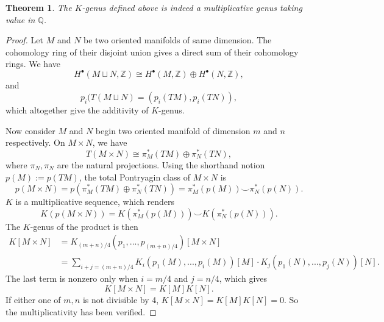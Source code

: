 \documentclass[11pt]{article}
\newtheorem{thm}{Theorem}[section]
\newcommand{\intg}{\mathbb Z}
\newcommand{\ratl}{\mathbb Q}
\begin{document}
 	\begin{thm}
 		The $K$-genus defined above is indeed a multiplicative genus taking value in $\ratl$.
 	\end{thm}
 	\begin{proof}
 		Let $M$ and $N$ be two oriented manifolds of same dimension. The cohomology ring of their disjoint union  gives a direct sum of their cohomology rings. We have
 		\begin{equation*}
 			H^\bullet(M\sqcup N,\intg)\cong H^\bullet(M,\intg)\oplus H^\bullet(N,\intg),
 		\end{equation*}
 		and 
 		\begin{equation*}
 			p_i(T(M\sqcup N)=(p_i(TM),p_i(TN)),
 		\end{equation*}
 		which altogether give the additivity of $K$-genus.

 		Now consider $M$ and $N$ begin two oriented manifold of dimension $m$ and $n$ respectively. On $M\times N$, we have
 		\begin{equation*}
 		T(M\times N)\cong \pi_M^*(TM)\oplus \pi_N^*(TN),
 		\end{equation*}
 		where $\pi_N,\pi_N$ are the natural projections. Using the shorthand notion $p(M):=p(TM)$, the total Pontryagin class of $M\times N$ is 
 		\begin{equation*}
 			p(M\times N)=p(\pi_M^*(TM)\oplus\pi_N^*(TN))=\pi_M^*(p(M))\smile \pi_N^*(p(N)).
 		\end{equation*}
 		$K$ is a multiplicative sequence, which renders
 		\begin{equation*}
 			K(p(M\times N))=K(\pi_M^*(p(M)))\smile K(\pi_N^*(p(N))).
 		\end{equation*}
 		The $K$-genus of the product is then
 		\begin{equation*}
 			\begin{aligned}
 				K[M\times N] & = K_{(m+n)/4}(p_1,...,p_{(m+n)/4})[M\times N]\\
 							&= \sum_{i+j=(m+n)/4}K_i(p_1(M),...,p_i(M))[M]\cdot K_j(p_1(N),...,p_j(N))[N].
 			\end{aligned}
 		\end{equation*}
 		The last term is nonzero only when $i=m/4$ and $j=n/4$, which gives
 		\begin{equation*}
 			K[M\times N]=K[M]K[N].
 		\end{equation*}
 		If either one of $m,n$ is not divisible by 4, $K[M\times N]=K[M]K[N]=0$. So the multiplicativity has been verified.


\end{proof}
\end{document}
